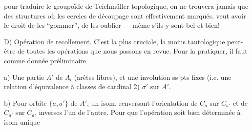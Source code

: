 
pour  traduire le groupoïde de Teichmüller topologique, on ne trouvera jamais que des structures où les cercles de découpage sont effectivement marqués.
 veut avoir le droit de les ``gommer'', de les oublier  --- même s'ils y sont bel et bien!

D) \uline{Opération de recollement}. C'est la plus cruciale, la moins tautologique peut-être de toutes les opérations que nous passons en revue.
Pour la pratiquer, il faut comme donnée préliminaire

a) Une partie  $A'$ de $A_l$ (arêtes libres), et une involution ss pts fixes (i.e. une relation d'équivalence à classes de cardinal 2) $\sigma'$ sur $A'$.

b) Pour   orbite  $\{a,a'\}$ de $A'$, un isom. renversant l'orientation de $C_a$ sur $C_{a'}$ et de $C_{a'}$ sur $C_a$, inverses l'un de l'autre.
Pour que l'opération soit bien déterminée à isom unique
